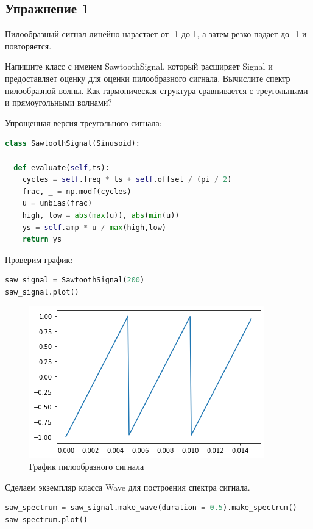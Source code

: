 \subsection{Упражнение 1}

Пилообразный сигнал линейно нарастает от -1 до 1, а затем резко падает до -1 и повторяется.

\noindent Напишите класс с именем SawtoothSignal, который расширяет Signal и предоставляет оценку для оценки пилообразного сигнала. Вычислите спектр пилообразной волны. Как гармоническая структура сравнивается с треугольными и прямоугольными волнами?

Упрощенная версия треугольного сигнала:

\begin{lstlisting}[language=Python]
class SawtoothSignal(Sinusoid):

  def evaluate(self,ts):
    cycles = self.freq * ts + self.offset / (pi / 2)
    frac, _ = np.modf(cycles)
    u = unbias(frac)
    high, low = abs(max(u)), abs(min(u))
    ys = self.amp * u / max(high,low)
    return ys
\end{lstlisting}

Проверим график:

\begin{lstlisting}[language=Python]
saw_signal = SawtoothSignal(200)
saw_signal.plot()
\end{lstlisting}

\begin{figure}[H]
	\begin{center}
		\includegraphics[scale=1]{fig/lab02/lab02_5_0.png}
		\caption{График пилообразного сигнала}
	\end{center}
\end{figure}

Сделаем экземпляр класса Wave для построения спектра сигнала.

\begin{lstlisting}[language=Python]
saw_spectrum = saw_signal.make_wave(duration = 0.5).make_spectrum()
saw_spectrum.plot()
\end{lstlisting}

